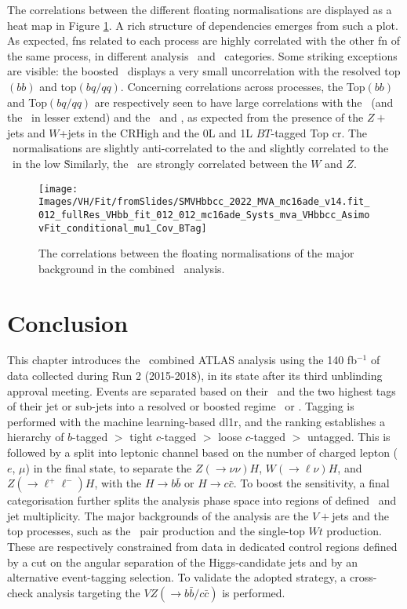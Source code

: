 The correlations between the different floating normalisations are displayed as a heat map in Figure \ref{fig:FNcorr}. A rich structure of dependencies emerges from such a plot. As expected, \gls{fn}s related to each process are highly correlated with the other \gls{fn} of the same process, in different analysis \ptv\ and \nj\ categories. Some striking exceptions are visible: the boosted \ttb\ displays a very small uncorrelation with the resolved top$(bb)$ and top$(bq/qq)$. Concerning correlations across processes, the Top$(bb)$ and Top$(bq/qq)$ are respectively seen to have large correlations with the \zhf\ (and the \whf\ in lesser extend) and the \wmf\ and \zmf, as expected from the presence of the $Z+$jets and $W$+jets in the CRHigh and the 0L and 1L $BT$-tagged Top \gls{cr}. The \whf\ normalisations are slightly anti-correlated to the \vlf and slightly correlated to the \zhf\ in the low \nj\. Similarly, the \vlf\ are strongly correlated between the $W$ and $Z$.
  
\begin{figure}[h!]
    \hspace{-1cm}
    \texttt{[image: Images/VH/Fit/fromSlides/SMVHbbcc\_2022\_MVA\_mc16ade\_v14.fit\_012\_fullRes\_VHbb\_fit\_012\_012\_mc16ade\_Systs\_mva\_VHbbcc\_AsimovFit\_conditional\_mu1\_Cov\_BTag]}
    \caption{The correlations between the floating normalisations of the major background in the combined \vhbc\ analysis.}
    \label{fig:FNcorr}
\end{figure} 

\section{Conclusion}
This chapter introduces the \vhbc\ combined ATLAS analysis using the 140 fb$^{-1}$ of data collected during Run 2 (2015-2018), in its state after its third unblinding approval meeting. Events are separated based on their \ptv\ and the two highest tags of their jet or sub-jets into a resolved or boosted regime \vhb\ or \vhc. Tagging is performed with the machine learning-based \gls{dl1r}, and the ranking establishes a hierarchy of $b$-tagged $>$ tight $c$-tagged $>$ loose $c$-tagged $>$ untagged. This is followed by a split into leptonic channel based on the number of charged lepton ($e$, $\mu$) in the final state, to separate the $Z(\rightarrow \nu\nu)H$, $W(\rightarrow \ell\nu)H$, and $Z(\rightarrow \ell^+\ell^-)H$, with the $H \rightarrow b\bar{b}$ or $H \rightarrow c\bar{c}$. To boost the sensitivity, a final categorisation further splits the analysis phase space into regions of defined \ptv\ and jet multiplicity. The major backgrounds of the analysis are the $V+$jets and the top processes, such as the \ttb\ pair production and the single-top $Wt$ production. These are respectively constrained from data in dedicated control regions defined by a cut on the angular separation of the Higgs-candidate jets and by an alternative event-tagging selection. To validate the adopted strategy, a cross-check analysis targeting the $VZ (\rightarrow b\bar{b}/c\bar{c})$ is performed. \\

